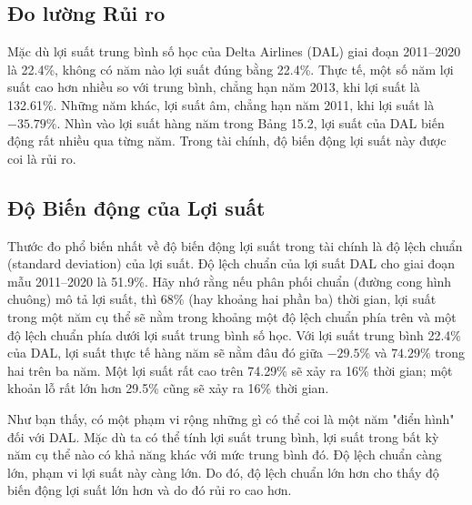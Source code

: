 \subsection*{Đo lường Rủi ro}

Mặc dù lợi suất trung bình số học của Delta Airlines (DAL) giai đoạn 2011--2020 là 22.4\%, không có năm nào lợi suất đúng bằng 22.4\%. Thực tế, một số năm lợi suất cao hơn nhiều so với trung bình, chẳng hạn năm 2013, khi lợi suất là 132.61\%. Những năm khác, lợi suất âm, chẳng hạn năm 2011, khi lợi suất là $-35.79\%$. Nhìn vào lợi suất hàng năm trong Bảng 15.2, lợi suất của DAL biến động rất nhiều qua từng năm. Trong tài chính, độ biến động lợi suất này được coi là rủi ro.

\subsection*{Độ Biến động của Lợi suất}

Thước đo phổ biến nhất về độ biến động lợi suất trong tài chính là độ lệch chuẩn (standard deviation) của lợi suất. Độ lệch chuẩn của lợi suất DAL cho giai đoạn mẫu 2011--2020 là 51.9\%. Hãy nhớ rằng nếu phân phối chuẩn (đường cong hình chuông) mô tả lợi suất, thì 68\% (hay khoảng hai phần ba) thời gian, lợi suất trong một năm cụ thể sẽ nằm trong khoảng một độ lệch chuẩn phía trên và một độ lệch chuẩn phía dưới lợi suất trung bình số học. Với lợi suất trung bình 22.4\% của DAL, lợi suất thực tế hàng năm sẽ nằm đâu đó giữa $-29.5\%$ và $74.29\%$ trong hai trên ba năm. Một lợi suất rất cao trên 74.29\% sẽ xảy ra 16\% thời gian; một khoản lỗ rất lớn hơn 29.5\% cũng sẽ xảy ra 16\% thời gian.

Như bạn thấy, có một phạm vi rộng những gì có thể coi là một năm "điển hình" đối với DAL. Mặc dù ta có thể tính lợi suất trung bình, lợi suất trong bất kỳ năm cụ thể nào có khả năng khác với mức trung bình đó. Độ lệch chuẩn càng lớn, phạm vi lợi suất này càng lớn. Do đó, độ lệch chuẩn lớn hơn cho thấy độ biến động lợi suất lớn hơn và do đó rủi ro cao hơn.


